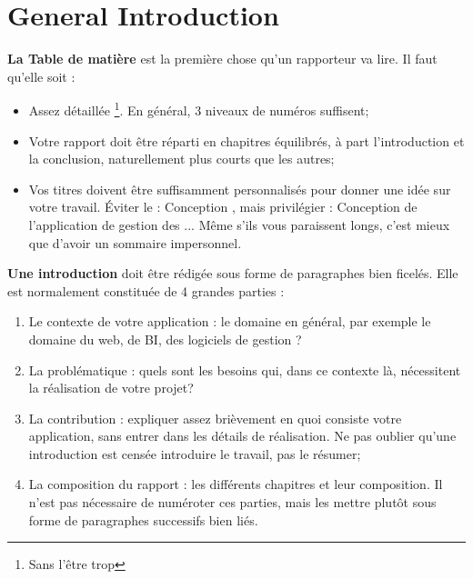 \chapter*{General Introduction}

\begin{spacing}{1.2}


\textbf{La Table de matière} est la première chose qu'un rapporteur va lire. Il faut qu'elle soit :
\begin{itemize}
\item Assez détaillée \footnote{Sans l'être trop}. En général, 3 niveaux de numéros suffisent;
\item Votre rapport doit être réparti en chapitres équilibrés, à part l'introduction et la conclusion, naturellement plus courts que les autres;
\item Vos titres doivent être suffisamment personnalisés pour donner une idée sur votre travail. Éviter le :  Conception ,  mais privilégier :  Conception de l'application de gestion des $...$  Même s'ils vous paraissent longs, c'est mieux que 
d'avoir un sommaire impersonnel. \\
\end{itemize}

\textbf{Une introduction} doit être rédigée sous forme de paragraphes bien ficelés. Elle est
normalement constituée de 4 grandes parties :
\begin{enumerate}
\item Le contexte de votre application : le domaine en général, par exemple le domaine du web, de BI, des logiciels de gestion ?
\item La problématique : quels sont les besoins qui, dans ce contexte là, nécessitent la réalisation de votre projet?
\item La contribution : expliquer assez brièvement en quoi consiste votre application, sans entrer dans les détails de réalisation. Ne pas oublier qu'une introduction est
 censée introduire le travail, pas le résumer; 
 \item La composition du rapport : les différents chapitres et leur composition. Il n'est pas nécessaire de numéroter ces parties, mais les mettre plutôt sous forme de paragraphes successifs bien liés.
\end{enumerate}






\end{spacing}


